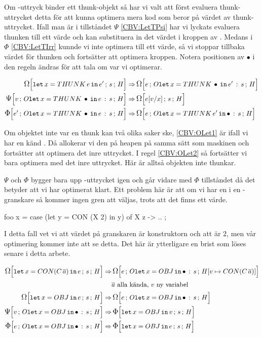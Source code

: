 \documentclass[../Optimise]{subfiles}
\begin{document}
Om -uttryck binder ett thunk-objekt så har vi valt att först evaluera thunk-uttrycket
detta för att kunna optimera mera kod som beror på värdet av thunk-uttrycket. Ifall
man är i tillståndet $\Psi$ \eqref{CBV:LetTPsi} har vi lyckats evaluera thunken till ett värde och kan
substituera in det värdet i kroppen av . Medans i $\Phi$ \eqref{CBV:LetTIrr} kunnde vi inte
optimera till ett värde, så vi stoppar tillbaka värdet för thunken och fortsätter att
optimera kroppen. Notera positionen av $\bullet$ i den regeln ändras för att tala om
var vi optimerar.

\begin{align}
\label{CBV:LetTOmg} \OMEGA sH{\eLet x{\THUNK e}{e'}}  \Rightarrow &\, \OMEGA{\oLet x{e'}s}He\\
\label{CBV:LetTPsi} \PSI{\oLet xes}Hv  \Rightarrow &\, \OMEGA sH{e[v/x]} \\
\label{CBV:LetTIrr} \IRR{\oLet xes}H{e'}  \Rightarrow &\, \OMEGA{\oLetObj x{\THUNK{e'}}s}He
\end{align}

Om objektet inte var en thunk kan två olika saker ske, \eqref{CBV:OLet1} är ifall 
vi har en känd . Då allokerar vi den på heapen på samma sätt som maskinen
och fortsätter att optimera det inre uttrycket. I regel \eqref{CBV:OLet2} så 
fortsätter vi bara optimera med det inre uttrycket. Här är alltså objekten
inte thunkar.

$\Psi$ och $\Phi$ bygger bara upp -uttrycket igen och går vidare med $\Phi$ tillståndet
då det betyder att vi har optimerat klart. Ett problem här är att om vi har en 
i en -granskare så kommer ingen gren att väljas, trots att det finns ett värde.

\begin{codeEx}
foo x = case (let y = CON (X 2) in y) of
    { X z -> ..
    };
\end{codeEx} 

I detta fall vet vi att värdet på granskaren är konstruktorn  och att  är $2$, men vår optimering
kommer inte att se detta. Det här är ytterligare en brist som löses senare i detta arbete.

\begin{align}
\label{CBV:OLet1} \OMEGA sH{\eLet x{\CON{C}{\many{a}}}{e}}  \Rightarrow &\, \OMEGA{\oLetObj x{OBJ}s}{\heap{v}{\CON{C}{\many{a}}}}e\\
 & \many{a} \text{ alla kända, } v \text{ ny variabel} \nonumber \\
\label{CBV:OLet2}\OMEGA sH{\eLet x{OBJ}{e}}  \Rightarrow &\, \OMEGA{\oLetObj x{OBJ}s}He\\
\PSI{\oLetObj x{OBJ}s}Hv  \Rightarrow &\, \IRR sH{\eLet x{OBJ}v}\\
\IRR{\oLetObj x{OBJ}s}He  \Rightarrow &\, \IRR sH{\eLet x{OBJ}e}
\end{align}
\end{document}

